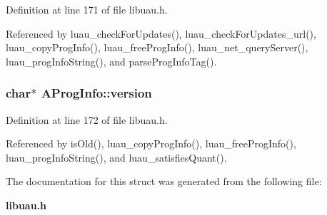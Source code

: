Definition at line 171 of file libuau.h.

Referenced by luau\_\-check\-For\-Updates(), luau\_\-check\-For\-Updates\_\-url(), luau\_\-copy\-Prog\-Info(), luau\_\-free\-Prog\-Info(), luau\_\-net\_\-query\-Server(), luau\_\-prog\-Info\-String(), and parse\-Prog\-Info\-Tag().
\subsubsection{\setlength{\rightskip}{0pt plus 5cm}char$\ast$ {\bf AProg\-Info::version}}\label{structAProgInfo_o5}




Definition at line 172 of file libuau.h.

Referenced by is\-Old(), luau\_\-copy\-Prog\-Info(), luau\_\-free\-Prog\-Info(), luau\_\-prog\-Info\-String(), and luau\_\-satisfies\-Quant().

The documentation for this struct was generated from the following file:\begin{CompactItemize}
\item 
{\bf libuau.h}\end{CompactItemize}
